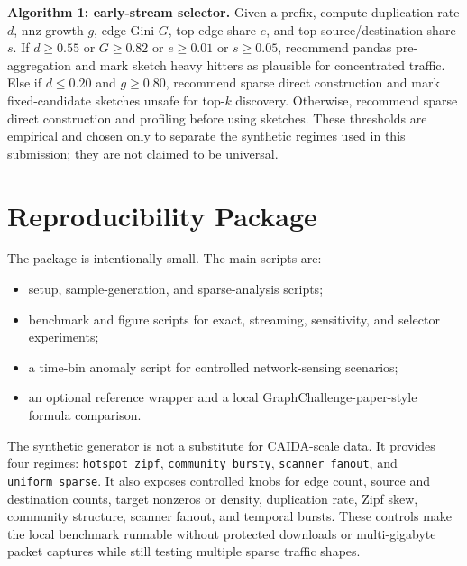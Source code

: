 \documentclass[conference]{IEEEtran}
\begin{document}
\noindent\textbf{Algorithm 1: early-stream selector.}
Given a prefix, compute duplication rate $d$, nnz growth $g$, edge Gini $G$, top-edge share $e$, and top source/destination share $s$. If $d \geq 0.55$ or $G \geq 0.82$ or $e \geq 0.01$ or $s \geq 0.05$, recommend pandas pre-aggregation and mark sketch heavy hitters as plausible for concentrated traffic. Else if $d \leq 0.20$ and $g \geq 0.80$, recommend sparse direct construction and mark fixed-candidate sketches unsafe for top-$k$ discovery. Otherwise, recommend sparse direct construction and profiling before using sketches. These thresholds are empirical and chosen only to separate the synthetic regimes used in this submission; they are not claimed to be universal.

\section{Reproducibility Package}
The package is intentionally small. The main scripts are:
\begin{itemize}
\item setup, sample-generation, and sparse-analysis scripts;
\item benchmark and figure scripts for exact, streaming, sensitivity, and selector experiments;
\item a time-bin anomaly script for controlled network-sensing scenarios;
\item an optional reference wrapper and a local GraphChallenge-paper-style formula comparison.
\end{itemize}

The synthetic generator is not a substitute for CAIDA-scale data. It provides four regimes: \texttt{hotspot\_zipf}, \texttt{community\_bursty}, \texttt{scanner\_fanout}, and \texttt{uniform\_sparse}. It also exposes controlled knobs for edge count, source and destination counts, target nonzeros or density, duplication rate, Zipf skew, community structure, scanner fanout, and temporal bursts. These controls make the local benchmark runnable without protected downloads or multi-gigabyte packet captures while still testing multiple sparse traffic shapes.
\end{document}
